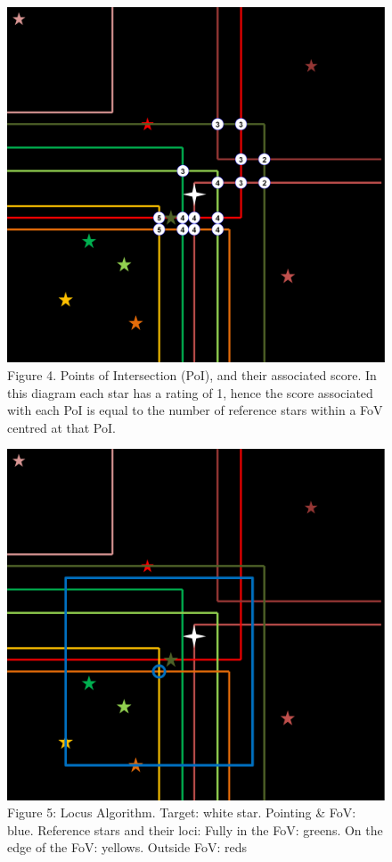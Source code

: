 \documentclass[]{elsarticle} %
\makeatletter
\def\maxwidth{\ifdim\Gin@nat@width>\linewidth\linewidth
\else\Gin@nat@width\fi}
\let\Oldincludegraphics\includegraphics
\renewcommand{\includegraphics}[1]{\Oldincludegraphics[width=\maxwidth]{#1}}
\makeatother
\begin{document}
\begin{figure}
\centering
\includegraphics{fig4.png}
\caption{Figure 4. Points of Intersection (PoI), and their associated
score. In this diagram each star has a rating of 1, hence the score
associated with each PoI is equal to the number of reference stars
within a FoV centred at that PoI.}
\end{figure}

\begin{figure}
\centering
\includegraphics{fig5.png}
\caption{Figure 5: Locus Algorithm. Target: white star. Pointing \& FoV:
blue. Reference stars and their loci: Fully in the FoV: greens. On the
edge of the FoV: yellows. Outside FoV: reds}
\end{figure}
\end{document}
